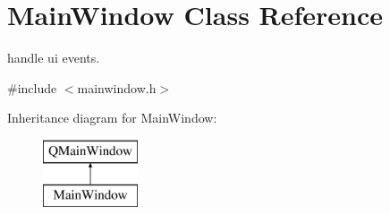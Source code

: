 \hypertarget{class_main_window}{\section{Main\-Window Class Reference}
\label{class_main_window}
}


handle ui events.  




{\ttfamily \#include $<$mainwindow.\-h$>$}

Inheritance diagram for Main\-Window\-:\begin{figure}[H]
\begin{center}
\leavevmode
\includegraphics[height=2.000000cm]{class_main_window}
\end{center}
\end{figure}
